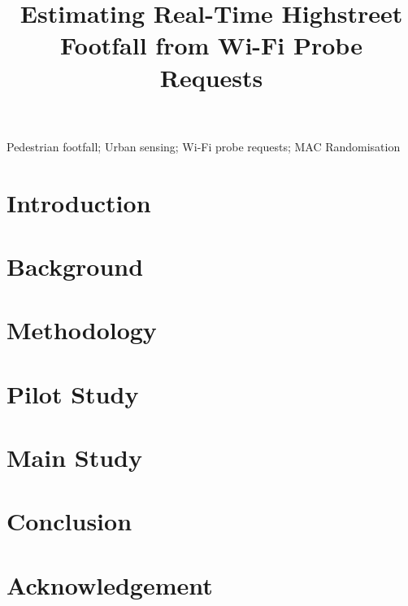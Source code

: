 \documentclass[]{interact}
\theoremstyle{plain}
\theoremstyle{definition}
\theoremstyle{remark}
\begin{document}
	\title{Estimating Real-Time Highstreet Footfall from Wi-Fi Probe Requests}
	\author{
	}
	\maketitle
	\begin{abstract}
		 \end{abstract}
	\begin{keywords}
		Pedestrian footfall; Urban sensing; Wi-Fi probe requests; MAC Randomisation \end{keywords}
	\section{Introduction}\label{introduction}
		
	\section{Background}\label{previous_work}
		
	\section{Methodology}\label{methodology}
		
	\section{Pilot Study}\label{pilot_study}
		
	\section{Main Study}\label{main_study}
		
	\section{Conclusion}\label{conclusion}
		
	\section*{Acknowledgement}
		
	 
\end{document}
